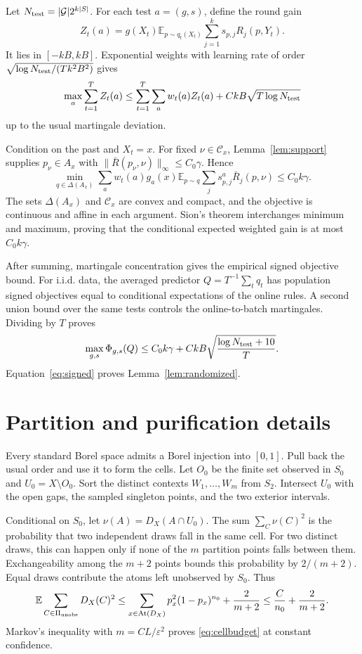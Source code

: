 \documentclass{article}
\theoremstyle{definition}
\theoremstyle{remark}
\newcommand{\E}{\mathbb E}
\newcommand{\1}{\mathbf 1}
\newcommand{\cG}{\mathcal G}
\newcommand{\cC}{\mathcal C}
\newcommand{\simplex}{\Delta}
\newcommand{\At}{\operatorname{At}}
\begin{document}
Let $N_{\rm test}=|\cG|2^{k|S|}$. For each test $a=(g,s)$, define the round gain \[ Z_t(a)=g(X_t)\E_{p\sim q_t(X_t)}\sum_{j=1}^ks_{p,j}R_j(p,Y_t). \] It lies in $[-kB,kB]$. Exponential weights with learning rate of order $\sqrt{\log N_{\rm test}/(Tk^2B^2)}$ gives \[ \max_a\sum_{t=1}^TZ_t(a) \le \sum_{t=1}^T\sum_aw_t(a)Z_t(a)+CkB\sqrt{T\log N_{\rm test}} \] up to the usual martingale deviation.

Condition on the past and $X_t=x$. For fixed $\nu\in\cC_x$, Lemma~\ref{lem:support} supplies $p_\nu\in A_x$ with $\|\bar R(p_\nu,\nu)\|_\infty\le C_0\gamma$. Hence \[ \min_{q\in\simplex(A_x)}\sum_aw_t(a)g_a(x)\E_{p\sim q}\sum_js^a_{p,j}\bar R_j(p,\nu) \le C_0k\gamma. \] The sets $\simplex(A_x)$ and $\cC_x$ are convex and compact, and the objective is continuous and affine in each argument. Sion's theorem interchanges minimum and maximum, proving that the conditional expected weighted gain is at most $C_0k\gamma$.

After summing, martingale concentration gives the empirical signed objective bound. For i.i.d. data, the averaged predictor $Q=T^{-1}\sum_tq_t$ has population signed objectives equal to conditional expectations of the online rules. A second union bound over the same tests controls the online-to-batch martingales. Dividing by $T$ proves \[ \max_{g,s}\Phi_{g,s}(Q) \le C_0k\gamma+CkB\sqrt{\frac{\log N_{\rm test}+10}{T}}. \] Equation~\eqref{eq:signed} proves Lemma~\ref{lem:randomized}.

\section{Partition and purification details}\label{app:purification}

Every standard Borel space admits a Borel injection into $[0,1]$. Pull back the usual order and use it to form the cells. Let $O_0$ be the finite set observed in $S_0$ and $U_0=X\setminus O_0$. Sort the distinct contexts $W_1,\ldots,W_m$ from $S_2$. Intersect $U_0$ with the open gaps, the sampled singleton points, and the two exterior intervals.

Conditional on $S_0$, let $\nu(A)=D_X(A\cap U_0)$. The sum $\sum_C\nu(C)^2$ is the probability that two independent draws fall in the same cell. For two distinct draws, this can happen only if none of the $m$ partition points falls between them. Exchangeability among the $m+2$ points bounds this probability by $2/(m+2)$. Equal draws contribute the atoms left unobserved by $S_0$. Thus \[ \E\sum_{C\in\Pi_{\rm unobs}}D_X(C)^2 \le \sum_{x\in\At(D_X)}p_x^2(1-p_x)^{n_0}+\frac2{m+2} \le \frac{C}{n_0}+\frac2{m+2}. \] Markov's inequality with $m=CL/\varepsilon^2$ proves \eqref{eq:cellbudget} at constant confidence.
\end{document}
